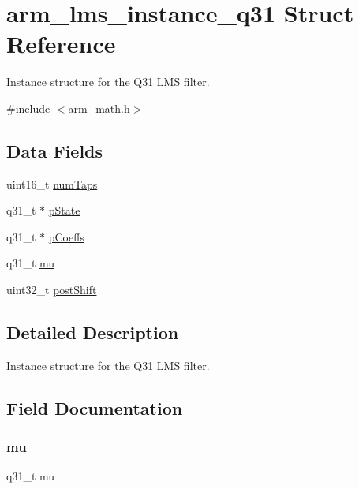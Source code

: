 \hypertarget{structarm__lms__instance__q31}{}\section{arm\+\_\+lms\+\_\+instance\+\_\+q31 Struct Reference}
\label{structarm__lms__instance__q31}


Instance structure for the Q31 L\+MS filter.  




{\ttfamily \#include $<$arm\+\_\+math.\+h$>$}

\subsection*{Data Fields}
\begin{DoxyCompactItemize}
\item 
uint16\+\_\+t \hyperlink{structarm__lms__instance__q31_a751941891e47f522a7f5375fe8990aac}{num\+Taps}
\item 
q31\+\_\+t $\ast$ \hyperlink{structarm__lms__instance__q31_adee4ba3ee8869865af7d8fa08ca913d6}{p\+State}
\item 
q31\+\_\+t $\ast$ \hyperlink{structarm__lms__instance__q31_a68888e36167d81cb7836db10367a1682}{p\+Coeffs}
\item 
q31\+\_\+t \hyperlink{structarm__lms__instance__q31_a21ab4237a726ea7751f5026d89d2e577}{mu}
\item 
uint32\+\_\+t \hyperlink{structarm__lms__instance__q31_aa2cacddfc5e1d86905d7d31a18b1979b}{post\+Shift}
\end{DoxyCompactItemize}


\subsection{Detailed Description}
Instance structure for the Q31 L\+MS filter. 

\subsection{Field Documentation}
\mbox{\label{structarm__lms__instance__q31_a21ab4237a726ea7751f5026d89d2e577}} 
\subsubsection{\texorpdfstring{mu}{mu}}
{\footnotesize\ttfamily q31\+\_\+t mu}

